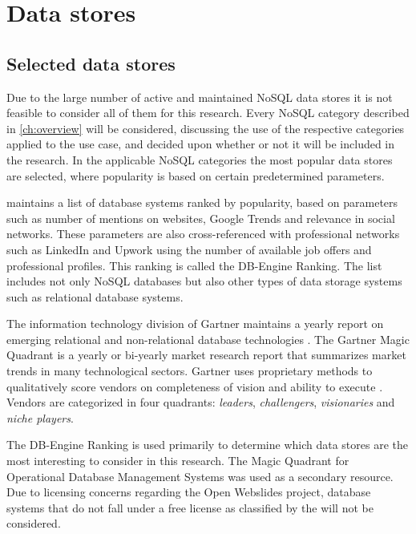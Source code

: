 \chapter{Data stores}
\label{ch:data-stores}

\section{Selected data stores}
\label{sec:selected-data-stores}

Due to the large number of active and maintained NoSQL data stores it is not feasible to consider all of them for this research.
Every NoSQL category described in \cref{ch:overview} will be considered, discussing the use of the respective categories applied to the use case, and decided upon whether or not it will be included in the research.
In the applicable NoSQL categories the most popular data stores are selected, where popularity is based on certain predetermined parameters.

\textcite{DBEngine2018} maintains a list of database systems ranked by popularity, based on parameters such as number of mentions on websites, Google Trends and relevance in social networks.
These parameters are also cross-referenced with professional networks such as LinkedIn \autocite{LinkedIn2002} and Upwork \autocite{Upwork2015} using the number of available job offers and professional profiles.
This ranking is called the DB-Engine Ranking.
The list includes not only NoSQL databases but also other types of data storage systems such as relational database systems.

The information technology division of Gartner maintains a yearly report on emerging relational and non-relational database technologies \autocite{Gartner2018}.
The Gartner Magic Quadrant is a yearly or bi-yearly market research report that summarizes market trends in many technological sectors.
Gartner uses proprietary methods to qualitatively score vendors on completeness of vision and ability to execute \autocite{Gartner2018mq}.
Vendors are categorized in four quadrants: \textit{leaders}, \textit{challengers}, \textit{visionaries} and \textit{niche players}.

The DB-Engine Ranking is used primarily to determine which data stores are the most interesting to consider in this research.
The Magic Quadrant for Operational Database Management Systems was used as a secondary resource.
Due to licensing concerns regarding the Open Webslides project, database systems that do not fall under a free license as classified by the \textcite{FreeSoftwareFoundation1985} will not be considered.

